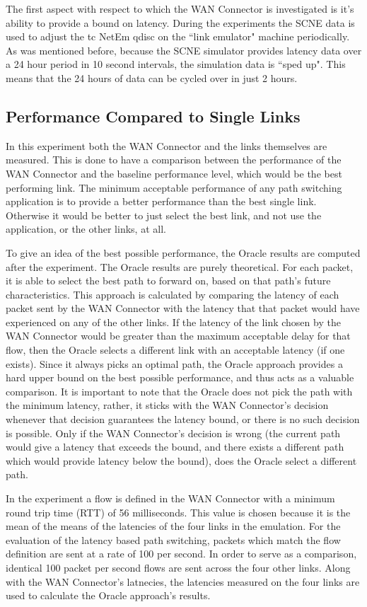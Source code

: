 The first aspect with respect to which the WAN Connector is investigated is it's ability to provide a bound on latency. During the experiments the SCNE data is used to adjust the tc NetEm qdisc on the “link emulator" machine periodically. As was mentioned before, because the SCNE simulator provides latency data over a 24 hour period in 10 second intervals, the simulation data is “sped up". This means that the 24 hours of data can be cycled over in just 2 hours.

\subsection{Performance Compared to Single Links}

In this experiment both the WAN Connector and the links themselves are measured. This is done to have a comparison between the performance of the WAN Connector and the baseline performance level, which would be the best performing link. The minimum acceptable performance of any path switching application is to provide a better performance than the best single link. Otherwise it would be better to just select the best link, and not use the application, or the other links, at all.

To give an idea of the best possible performance, the Oracle results are computed after the experiment.  The Oracle results are purely theoretical. For each packet, it is able to select the best path to forward on, based on that path's future characteristics. This approach is calculated by comparing the latency of each packet sent by the WAN Connector with the latency that that packet would have experienced on any of the other links. If the latency of the link chosen by the WAN Connector would be greater than the maximum acceptable delay for that flow, then the Oracle selects a different link with an acceptable latency (if one exists). Since it always picks an optimal path, the Oracle approach provides a hard upper bound on the best possible performance, and thus acts as a valuable comparison. It is important to note that the Oracle does not pick the path with the minimum latency, rather, it sticks with the WAN Connector's decision whenever that decision guarantees the latency bound, or there is no such decision is possible. Only if the WAN Connector's decision is wrong (the current path would give a latency that exceeds the bound, and there exists a different path which would provide latency below the bound), does the Oracle select a different path.

In the experiment a flow is defined in the WAN Connector with a minimum round trip time (RTT) of 56 milliseconds. This value is chosen because it is the mean of the means of the latencies of the four links in the emulation. For the evaluation of the latency based path switching, packets which match the flow definition are sent at a rate of 100 per second. In order to serve as a comparison, identical 100 packet per second flows are sent across the four other links. Along with the WAN Connector's latnecies, the latencies measured on the four links are used to calculate the Oracle approach's results.

